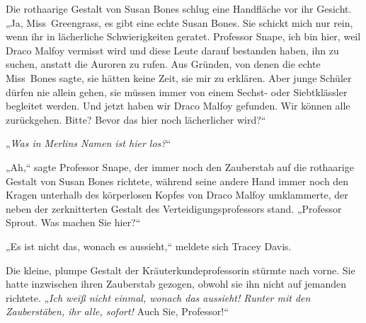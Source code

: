 Die rothaarige Gestalt von Susan Bones schlug eine Handfläche vor ihr Gesicht.
„Ja, Miss~Greengrass, es gibt eine echte Susan Bones. Sie schickt mich nur rein, wenn ihr in lächerliche Schwierigkeiten geratet. Professor Snape, ich bin hier, weil Draco Malfoy vermisst wird und diese Leute darauf bestanden haben, ihn zu suchen, anstatt die Auroren zu rufen. Aus Gründen, von denen die echte Miss~Bones sagte, sie hätten keine Zeit, sie mir zu erklären. Aber junge Schüler dürfen nie allein gehen, sie müssen immer von einem Sechst- oder Siebtklässler begleitet werden. Und jetzt haben wir Draco Malfoy gefunden. Wir können alle zurückgehen. Bitte? Bevor das hier noch lächerlicher wird?“

„\emph{Was in Merlins Namen ist hier los?}“

„Ah,“ sagte Professor Snape, der immer noch den Zauberstab auf die rothaarige Gestalt von Susan Bones richtete, während seine andere Hand immer noch den Kragen unterhalb des körperlosen Kopfes von Draco Malfoy umklammerte, der neben der zerknitterten Gestalt des Verteidigungsprofessors stand.
„Professor Sprout. Was machen Sie hier?“

„Es ist nicht das, wonach es aussieht,“ meldete sich Tracey Davis.

Die kleine, plumpe Gestalt der Kräuterkundeprofessorin stürmte nach vorne. Sie hatte inzwischen ihren Zauberstab gezogen, obwohl sie ihn nicht auf jemanden richtete.
„\emph{Ich weiß nicht einmal, wonach das aussieht! \emph{Runter mit den Zauberstäben}, ihr alle, sofort!} Auch Sie, Professor!“


